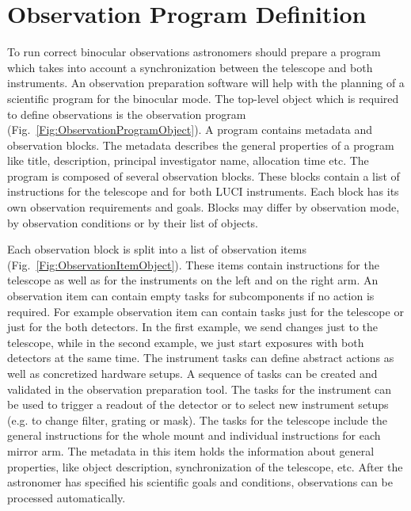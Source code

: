 \section{Observation Program Definition}

To run correct binocular observations astronomers should prepare a program which takes into account a synchronization 
between the telescope and both instruments. An observation preparation software will help with the planning of a scientific program for 
the binocular mode. 
The top-level object which is required to define observations is the observation program (Fig.~\ref{Fig:ObservationProgramObject}). 
A program contains metadata and observation blocks. 
The metadata describes the general properties of a program like title, description, principal investigator name, allocation time etc. 
The program is composed of several observation blocks. These blocks contain a list of instructions for the telescope and 
for both LUCI instruments. Each block has its own observation requirements and goals. Blocks may differ by observation mode, by observation conditions or 
by their list of objects. 

Each observation block is split into a list of observation items (Fig.~\ref{Fig:ObservationItemObject}). 
These items contain instructions for the
telescope as well as for the instruments on the left and on the right arm. 
An observation item can contain empty tasks for subcomponents if no action is required.
For example observation item can contain tasks just for the telescope or just for the both detectors. 
In the first example, we send changes just to the telescope, while in the second example, we just start exposures with both detectors at the same time.
The instrument tasks
can define abstract actions as well as concretized hardware setups. A sequence of tasks can be
created and validated in the observation preparation tool. 
The tasks for the instrument can be used to
trigger a readout of the detector or to select new instrument setups (e.g. to change filter, grating or
mask). The tasks for the telescope include the general instructions for the whole mount and individual
instructions for each mirror arm. The metadata in this item holds the information about general properties, like
object description, synchronization of the telescope, etc. 
After the astronomer has specified his scientific goals and conditions, observations can be processed
automatically.

